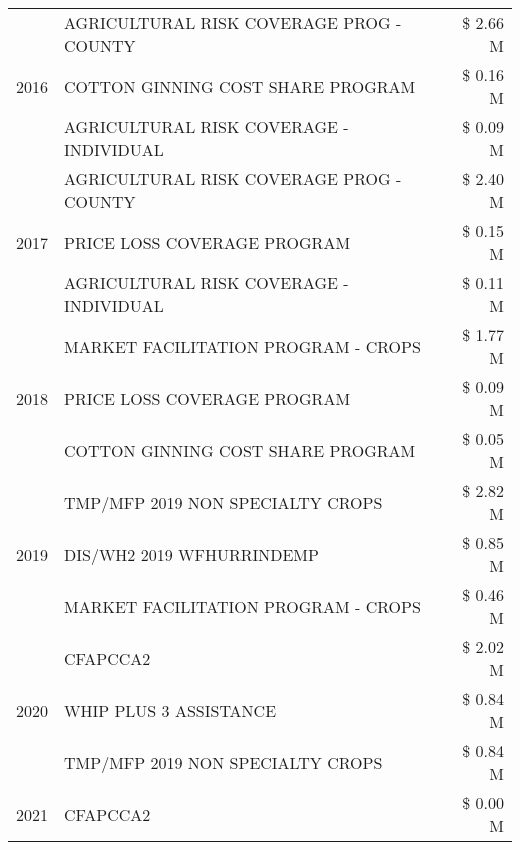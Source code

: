 \begin{tabular}{llr}
\cline{1-3}
\multirow[t]{3}{*}{2016} & AGRICULTURAL RISK COVERAGE PROG - COUNTY & \$ 2.66 M \\
 & COTTON GINNING COST SHARE PROGRAM & \$ 0.16 M \\
 & AGRICULTURAL RISK COVERAGE - INDIVIDUAL & \$ 0.09 M \\
\cline{1-3}
\multirow[t]{3}{*}{2017} & AGRICULTURAL RISK COVERAGE PROG - COUNTY & \$ 2.40 M \\
 & PRICE LOSS COVERAGE PROGRAM & \$ 0.15 M \\
 & AGRICULTURAL RISK COVERAGE - INDIVIDUAL & \$ 0.11 M \\
\cline{1-3}
\multirow[t]{3}{*}{2018} & MARKET FACILITATION PROGRAM - CROPS & \$ 1.77 M \\
 & PRICE LOSS COVERAGE PROGRAM & \$ 0.09 M \\
 & COTTON GINNING COST SHARE PROGRAM & \$ 0.05 M \\
\cline{1-3}
\multirow[t]{3}{*}{2019} & TMP/MFP 2019 NON SPECIALTY CROPS & \$ 2.82 M \\
 & DIS/WH2 2019 WFHURRINDEMP & \$ 0.85 M \\
 & MARKET FACILITATION PROGRAM - CROPS & \$ 0.46 M \\
\cline{1-3}
\multirow[t]{3}{*}{2020} & CFAPCCA2 & \$ 2.02 M \\
 & WHIP PLUS 3 ASSISTANCE & \$ 0.84 M \\
 & TMP/MFP 2019 NON SPECIALTY CROPS & \$ 0.84 M \\
\cline{1-3}
2021 & CFAPCCA2 & \$ 0.00 M \\
\cline{1-3}
\bottomrule
\end{tabular}
